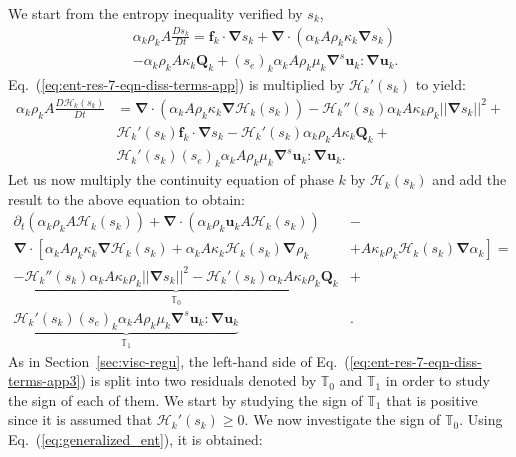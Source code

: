 \documentclass[preprint,10pt]{elsarticle}
\renewcommand{\div}{\mbold{\nabla}\! \cdot \!}
\newcommand{\grad}{\mbold{\nabla}}
\newcommand{\mbold}[1]{\boldsymbol#1}
\newcommand{\eqt}[1]{Eq.~(\ref{#1})}                     %
\newcommand{\sct}[1]{Section~\ref{#1}}                   %
\begin{document}
\begin{appendices}
We start from the entropy inequality verified by $s_k$,
%
\begin{align}\label{eq:ent-res-7-eqn-diss-terms-app}
&\alpha_k \rho_k A \frac{Ds_k}{Dt} =  \mbold f_k \cdot \grad s_k + \div \left( \alpha_k A \rho_k \kappa_k  \grad s_k \right)  \nonumber\\
&- \alpha_k \rho_k A \kappa_k \mathbf{Q}_k + (s_e)_k \alpha_k A \rho_k \mu_k \grad^s \mbold u_k : \grad \mbold u_k.
\end{align}
%
\eqt{eq:ent-res-7-eqn-diss-terms-app} is multiplied by $\mathscr{H}_k'(s_k)$ to yield:
%
\begin{align}\label{eq:ent-res-7-eqn-diss-terms-app2}
\alpha_k \rho_k A \frac{D\mathscr{H}_k(s_k)}{Dt} &= \div \left( \alpha_k A \rho_k \kappa_k \grad \mathscr{H}_k (s_k) \right) - \mathscr{H}_k''(s_k) \alpha_k A \kappa_k \rho_k || \grad s_k ||^2 + \nonumber\\
&\mathscr{H}_k'(s_k) \mbold f_k \cdot \grad s_k - \mathscr{H}_k'(s_k)\alpha_k \rho_k A \kappa_k \mathbf{Q}_k + \nonumber \\
& \mathscr{H}_k'(s_k)(s_e)_k \alpha_k A \rho_k \mu_k \grad^s \mbold u_k : \grad \mbold u_k.
\end{align}
%
Let us now multiply the continuity equation of phase $k$ by $\mathscr{H}_k (s_k)$ and add the result to the above equation to obtain:
%
\begin{align}\label{eq:ent-res-7-eqn-diss-terms-app3}
\partial_t \left( \alpha_k \rho_k A \mathscr{H}_k(s_k)\right) + \div \left( \alpha_k \rho_k \mbold u_k A \mathscr{H}_k(s_k) \right)  &- \nonumber\\
\div \left[ \alpha_k A \rho_k \kappa_k \grad \mathscr{H}_k (s_k) + \alpha_k A \kappa_k \mathscr{H}_k (s_k) \grad \rho_k  \right. & \left. + A \kappa_k \rho_k \mathscr{H}_k (s_k) \grad \alpha_k\right] = \nonumber \\
 \underbrace{-\mathscr{H}_k''(s_k) \alpha_k A \kappa_k \rho_k || \grad s_k ||^2  - \mathscr{H}_k'(s_k) \alpha_k A \kappa_k \rho_k  \mathbf{Q}_k}_{\mathbb{T}_0} &+\nonumber \\
\underbrace{ \mathscr{H}_k'(s_k)(s_e)_k  \alpha_k A \rho_k \mu_k \grad^s \mbold u_k : \grad \mbold u_k}_{\mathbb{T}_1} & .
\end{align}
%
As in \sct{sec:visc-regu}, the left-hand side of \eqt{eq:ent-res-7-eqn-diss-terms-app3} is split into two residuals denoted by $\mathbb{T}_0$ and $\mathbb{T}_1$ in order to study the sign of each of them. We start by studying the sign of $\mathbb{T}_1$ that is positive since it is assumed that $ \mathscr{H}_k'(s_k) \geq 0$. We now investigate the sign of $\mathbb{T}_0$. Using \eqt{eq:generalized_ent}, it is obtained:

\end{appendices}
\end{document}

